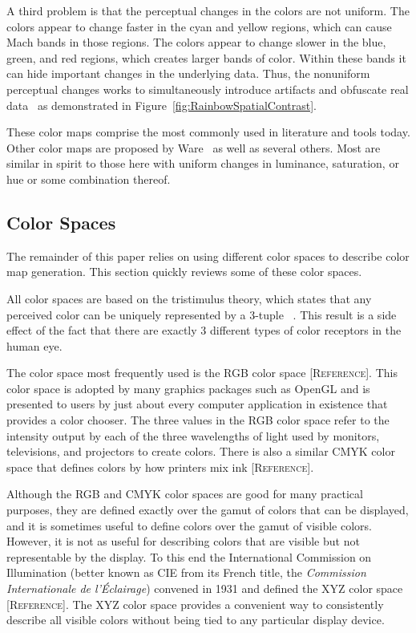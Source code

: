 \documentclass[twocolumn]{article}
\newcommand{\lcite}[1]{~\cite{#1}}
\newcommand{\scite}[1]{~\cite{#1}}
\newcommand{\sticky}[1]{\textsc{[#1]}}
\newcommand{\RGB}{RGB\xspace}
\newcommand{\CMYK}{CMYK\xspace}
\newcommand{\XYZ}{XYZ\xspace}
\begin{document}
A third problem is that the perceptual changes in the colors are not
uniform.  The colors appear to change faster in the cyan and yellow
regions, which can cause Mach bands in those regions.  The colors appear to
change slower in the blue, green, and red regions, which creates larger
bands of color.  Within these bands it can hide important changes in the
underlying data.  Thus, the nonuniform perceptual changes works to
simultaneously introduce artifacts and obfuscate real
data\lcite{Borland07} as demonstrated in
Figure~\ref{fig:RainbowSpatialContrast}.

These color maps comprise the most commonly used in literature and tools
today.  Other color maps are proposed by Ware\scite{Ware04} as well as
several others.  Most are similar in spirit to those here with uniform
changes in luminance, saturation, or hue or some combination thereof.

\subsection{Color Spaces}
\label{sec:PreviousWork:ColorSpaces}

The remainder of this paper relies on using different color spaces to
describe color map generation.  This section quickly reviews some of these
color spaces.

All color spaces are based on the tristimulus theory, which states that any
perceived color can be uniquely represented by a
3-tuple\lcite{Feynman63,Stone05} .  This result is a side effect of the
fact that there are exactly 3 different types of color receptors in the
human eye.

The color space most frequently used is the \RGB color space
\sticky{Reference}.  This color space is adopted by many graphics packages
such as OpenGL and is presented to users by just about every computer
application in existence that provides a color chooser.  The three values
in the \RGB color space refer to the intensity output by each of the three
wavelengths of light used by monitors, televisions, and projectors to
create colors.  There is also a similar \CMYK color space that defines
colors by how printers mix ink \sticky{Reference}.

Although the \RGB and \CMYK color spaces are good for many practical
purposes, they are defined exactly over the gamut of colors that can be
displayed, and it is sometimes useful to define colors over the gamut of
visible colors.  However, it is not as useful for describing colors that
are visible but not representable by the display.  To this end the
International Commission on Illumination (better known as CIE from its
French title, the \emph{Commission Internationale de l'\'{E}clairage})
convened in 1931 and defined the \XYZ color space \sticky{Reference}.  The
\XYZ color space provides a convenient way to consistently describe all
visible colors without being tied to any particular display device.
\end{document}
